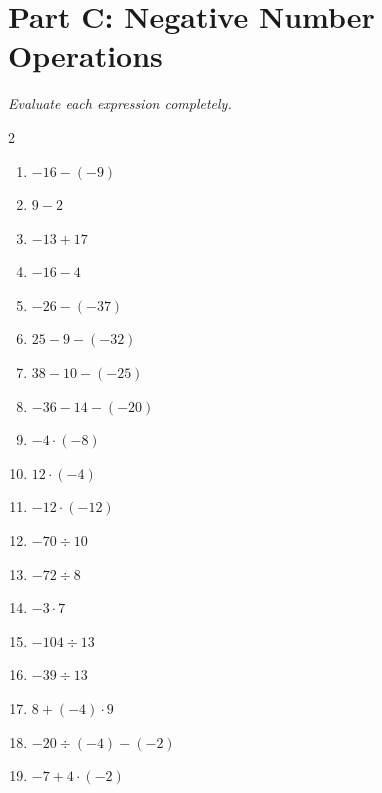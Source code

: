 \documentclass[11pt]{article}
\begin{document}
\section*{Part C: Negative Number Operations}
\noindent\textit{Evaluate each expression completely.}
\begin{multicols}{2}
\begin{enumerate}
  \item $-16 - (-9)$
  \vspace{1.1cm}
  \item $9 - 2$
  \vspace{1.1cm}
  \item $-13 + 17$
  \vspace{1.1cm}
  \item $-16 - 4$
  \vspace{1.1cm}
  \item $-26 - (-37)$
  \vspace{1.1cm}
  \item $25 - 9 - (-32)$
  \vspace{1.1cm}
  \item $38 - 10 - (-25)$
  \vspace{1.1cm}
  \item $-36 - 14 - (-20)$
  \vspace{1.1cm}
  \item $-4 \cdot (-8)$
  \vspace{1.1cm}
  \item $12 \cdot (-4)$
  \vspace{1.1cm}
  \item $-12 \cdot (-12)$
  \vspace{1.1cm}
  \item $-70 \div 10$
  \vspace{1.1cm}
  \item $-72 \div 8$
  \vspace{1.1cm}
  \item $-3 \cdot 7$
  \vspace{1.1cm}
  \item $-104 \div 13$
  \vspace{1.1cm}
  \item $-39 \div 13$
  \vspace{1.1cm}
  \item $8 + (-4) \cdot 9$
  \vspace{1.1cm}
  \item $-20 \div (-4) - (-2)$
  \vspace{1.1cm}
  \item $-7 + 4 \cdot (-2)$

\end{enumerate}
\end{multicols}
\end{document}
